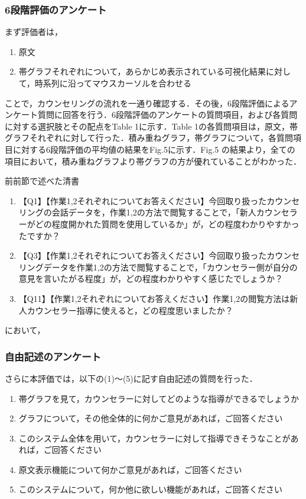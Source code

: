 \documentclass[shuuron]{kuee}
\begin{document}
\subsubsection{6段階評価のアンケート}

まず評価者は，
\begin{enumerate}

 \item 原文
  \item 帯グラフそれぞれについて，あらかじめ表示されている可視化結果に対して，時系列に沿ってマウスカーソルを合わせる
\end{enumerate}


ことで，カウンセリングの流れを一通り確認する．その後，6段階評価によるアンケート質問に回答を行う．6段階評価のアンケートの質問項目，および各質問に対する選択肢とその配点をTable 1に示す．Table 1の各質問項目は，原文，帯グラフそれぞれに対して行った．積み重ねグラフ，帯グラフについて，各質問項目に対する6段階評価の平均値の結果をFig.5に示す．Fig.5 の結果より，全ての項目において，積み重ねグラフより帯グラフの方が優れていることがわかった．


前前節で述べた清書

\begin{enumerate}

 \item 【Q1】【作業1,2それぞれについてお答えください】今回取り扱ったカウンセリングの会話データを，作業1,2の方法で閲覧することで，「新人カウンセラーがどの程度開かれた質問を使用しているか」が，どの程度わかりやすかったですか？
  \item 【Q3】【作業1,2それぞれについてお答えください】今回取り扱ったカウンセリングデータを作業1,2の方法で閲覧することで，「カウンセラー側が自分の意見を言いたがる程度」が，どの程度わかりやすく感じたでしょうか？
   \item 【Q11】【作業1,2それぞれについてお答えください】作業1,2の閲覧方法は新人カウンセラー指導に使えると，どの程度思いましたか？
\end{enumerate}

において，



\subsubsection{自由記述のアンケート}


さらに本評価では，以下の(1)～(5)に記す自由記述の質問を行った．



\begin{enumerate}
 \item 帯グラフを見て，カウンセラーに対してどのような指導ができるでしょうか
 \item グラフについて，その他全体的に何かご意見があれば，ご回答ください
 \item このシステム全体を用いて，カウンセラーに対して指導できそうなことがあれば，ご回答ください
 \item 原文表示機能について何かご意見があれば，ご回答ください
 \item このシステムについて，何か他に欲しい機能があれば，ご回答ください
\end{enumerate}
\end{document}
